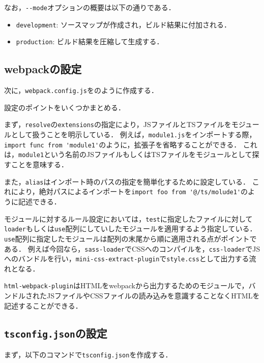 \documentclass[autodetect-engine,dvi=dvipdfmx,ja=standard,
               a4j,11pt]{bxjsarticle}
\newcommand{\figref}[1]{\makebox{図~\ref{#1}}}
\begin{document}
なお，\verb|--mode|オプションの概要は以下の通りである．

\begin{itemize}
  \item {\tt development}: ソースマップが作成され，ビルド結果に付加される．
  \item {\tt production}:  ビルド結果を圧縮して生成する．
\end{itemize}

\subsection{webpackの設定}

次に，\verb|webpack.config.js|を\figref{prog:webpack}のように作成する．



設定のポイントをいくつかまとめる．

まず，\verb|resolve|の\verb|extensions|の指定により，JSファイルとTSファイルをモジュールとして扱うことを明示している．
例えば，\verb|module1.js|をインポートする際，\verb|import func from 'module1'|のように，拡張子を省略することができる．
これは，\verb|module1|という名前のJSファイルもしくはTSファイルをモジュールとして探すことを意味する．

また，\verb|alias|はインポート時のパスの指定を簡単化するために設定している．
これにより，絶対パスによるインポートを\verb|import foo from '@/ts/molude1'|のように記述できる．

モジュールに対するルール設定においては，\verb|test|に指定したファイルに対して\verb|loader|もしくは\verb|use|配列にしていしたモジュールを適用するよう指定している．
\verb|use|配列に指定したモジュールは配列の末尾から順に適用される点がポイントである．
例えば今回なら，\verb|sass-loader|でCSSへのコンパイルを，\verb|css-loader|でJSへのバンドルを行い，\verb|mini-css-extract-plugin|で\verb|style.css|として出力する流れとなる．

\verb|html-webpack-plugin|はHTMLをwebpackから出力するためのモジュールで，バンドルされたJSファイルやCSSファイルの読み込みを意識することなくHTMLを記述することができる．

\subsection{{\tt tsconfig.json}の設定}

まず，以下のコマンドで\verb|tsconfig.json|を作成する．
\end{document}
